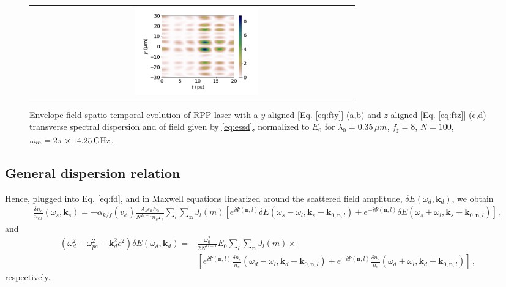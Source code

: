 \documentclass[
 reprint,
 amsmath,amssymb,
 aps,
]{revtex4-1}
\begin{document}
\begin{widetext}
\begin{figure}
\begin{tabular}{cc}
         &  \includegraphics[width=0.4\textwidth]{ESSD_yt_m10_ft0.png}
    \end{tabular}
    \caption{Envelope field spatio-temporal evolution of RPP  laser with a $y$-aligned  [Eq. \eqref{eq:fty}] (a,b) and $z$-aligned  [Eq. \eqref{eq:ftz}] (c,d) transverse spectral  dispersion and of field given by  \eqref{eq:essd}, normalized to $E_0$ for $\lambda_0=0.35\, \mu m$, $f_\sharp = 8$, $N=100$, $\omega_m =2\pi\times  14.25\, \rm GHz$. }
    \label{fig:essd}
\end{figure}

\subsection{General dispersion relation}
Hence, plugged into Eq. \eqref{eq:fd},  and in Maxwell equations linearized around the scattered field amplitude, $\delta E(\omega_d,\mathbf{k}_d) $, we obtain
\begin{align}
   \frac{\delta n_e }{n_{e0}}(\omega_s,\mathbf{k}_s) = -\alpha_{k/f}(v_\phi) \frac{A_k\epsilon_0 E_0}{N^{D-1} n_c T_e}   \sum_{l} \sum_{\mathbf{n}}  J_l(m) \left[  
     e^{i \Psi(\mathbf{n},l)} \delta E (\omega_s-\omega_l, \mathbf{k}_s-\mathbf{k}_{0,\mathbf{n},l})  
   +e^{-i \Psi(\mathbf{n},l)  } \delta E(\omega_s+\omega_l, \mathbf{k}_s+\mathbf{k}_{0,\mathbf{n},l})
   \right]
   \, ,\label{eq:fssd} 
\end{align}
and  
\begin{align}
    (\omega_d^2 - \omega_{pe}^2 -\mathbf{k}_d^2c^2)\delta E(\omega_d,\mathbf{k}_d) =& \frac{\omega_0^2}{2N^{D-1}} E_0 \sum_l\sum_{\mathbf{n}  }  J_l(m)  \times \nonumber \\ &\left[
    e^{i\Psi(\mathbf{n},l)}\frac{\delta n_e }{n_c}(\omega_d-\omega_l, \mathbf{k}_d-\mathbf{k}_{0,\mathbf{n},l})
    +e^{-i\Psi(\mathbf{n},l)}\frac{\delta n_e }{n_c}(\omega_d+\omega_l, \mathbf{k}_d+\mathbf{k}_{0,\mathbf{n},l}) \right] \, ,\label{eq:maxssd}
\end{align}
respectively.


\end{widetext}
\end{document}
